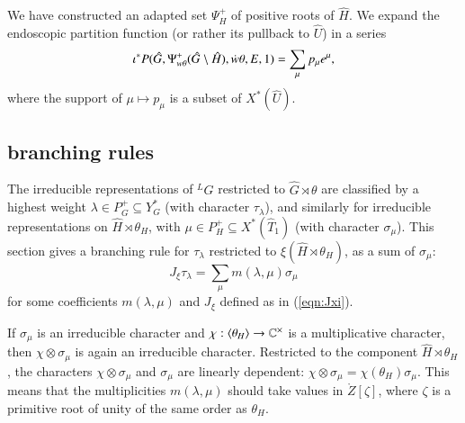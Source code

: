 We have constructed an adapted set $\Psi^+_H$ of positive roots of
$\hat H$.  We expand the endoscopic partition function (or rather its
pullback to $\hat U$) in a series
\begin{equation}
\iota^* P(\hat G,\Psi_{w\theta}^+
(\hat G\setminus\hat H),\dot w\theta,E,1) = \sum_{\mu} p_\mu e^\mu,
\end{equation}
where the support of $\mu\mapsto p_\mu$ is a subset of $X^*(\hat U)$.

\subsection{branching rules}

The irreducible representations of ${}^LG$ restricted to $\hat
G\rtimes\theta$ are classified by a highest weight $\lambda\in
P^+_G\subseteq Y^*_G$ (with character $\tau_\lambda$), and similarly
for irreducible representations on $\hat H\rtimes \theta_H$, with
$\mu\in P^+_H\subseteq X^*(\hat T_1)$ (with character $\sigma_\mu$).
This section gives a branching rule for $\tau_\lambda$ restricted to
$\xi(\hat H\rtimes\theta_H)$, as a sum of $\sigma_\mu$:
\[
J_\xi\tau_\lambda = \sum_\mu m(\lambda,\mu) \sigma_\mu
\]
for some coefficients $m(\lambda,\mu)$ and $J_\xi$ defined as in
(\ref{eqn:Jxi}).

If $\sigma_\mu$ is an irreducible character and
$\chi:\langle{\theta_H}\rangle\to \mathbb{C}^\times$ is a multiplicative
character, then $ \chi\otimes\sigma_\mu$ is again an irreducible
character.  Restricted to the component $\hat H\rtimes\theta_H$, the
characters $\chi\otimes\sigma_\mu$ and $\sigma_\mu$ are linearly
dependent: $\chi\otimes\sigma_\mu = \chi(\theta_H) \sigma_\mu $.  This
means that the multiplicities $m(\lambda,\mu)$ should take values in
$\ring{Z}[\zeta]$, where $\zeta$ is a primitive root of unity of the
same order as $\theta_H$.


